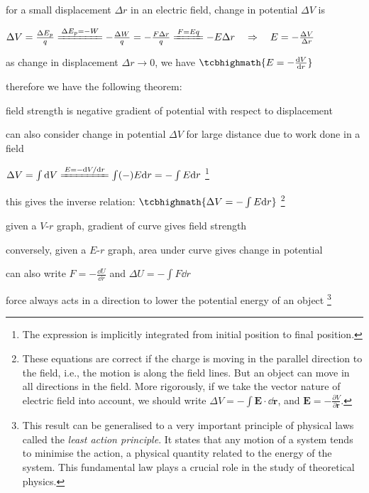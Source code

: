 for a small displacement $\Delta r$ in an electric field, change in potential $\Delta V$ is

{

\centering

$\Delta V = \frac{\Delta E_p}{q} \xlongequal{\Delta E_p=-W} - \frac{\Delta W}{q} = - \frac{F \Delta r}{q} \xlongequal{F=Eq} - E \Delta r \RA E = - \frac{\Delta V}{\Delta r}$

}

\eqyskip as change in displacement $\Delta r \to 0$, we have $\tcbhighmath{E = - \frac{\dd V}{\dd r}}$

therefore we have the following theorem:

\begin{ilight}
	\centering field strength is negative gradient of potential with respect to displacement
\end{ilight}

\newpage

can also consider change in potential $\Delta V$ for large distance due to work done in a field

{
	
\centering

$\Delta V= \int \dd V \xlongequal{E = -\dd V/\dd r}  \int (-)E \dd r =  -\int E \dd r$
\footnote{The expression is implicitly integrated from initial position to final position.}

}

\eqyskip this gives the inverse relation: $\tcbhighmath{\Delta V = -\int E \dd r}$
\footnote{These equations are correct if the charge is moving in the parallel direction to the field, i.e., the motion is along the field lines. But an object can move in all directions in the field. More rigorously, if we take the vector nature of electric field into account, we should write $\Delta V = - \int \mathbf{E}\cdot\dd\mathbf{r}$, and $\mathbf{E} = - \frac{\partial V}{\partial \mathbf{r}}$. \piste}

\cmt given a $V$-$r$ graph, gradient of curve gives field strength

conversely, given a $E$-$r$ graph, area under curve gives change in potential

\cmt can also write $F = - \frac{\dd U}{\dd r}$ and $\Delta U = -\int F \dd r$

force always acts in a direction to lower the potential energy of an object
\footnote{This result can be generalised to a very important principle of physical laws called the \emph{least action principle}. It states that any motion of a system tends to minimise the action, a physical quantity related to the energy of the system. This fundamental law plays a crucial role in the study of theoretical physics. \piste}

